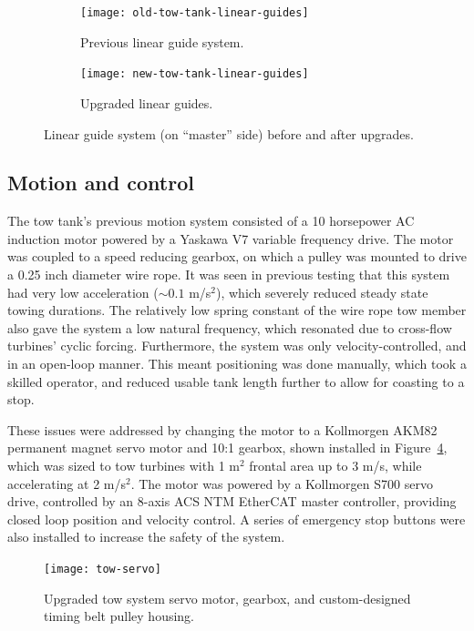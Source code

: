 \begin{figure}[ht]
    \centering
    
    \begin{subfigure}{0.47\textwidth}
        \texttt{[image: old-tow-tank-linear-guides]}
        \caption{Previous linear guide system.}
        \label{fig:old-linear-guides}
    \end{subfigure}
    \begin{subfigure}{0.47\textwidth}
        \texttt{[image: new-tow-tank-linear-guides]}
        \caption{Upgraded linear guides.}
        \label{fig:new-linear-guides}
    \end{subfigure}
    
    \caption{Linear guide system (on ``master'' side) before and after
        upgrades.}
\end{figure}


\subsection{Motion and control}

The tow tank's previous motion system consisted of a 10 horsepower AC induction
motor powered by a Yaskawa V7 variable frequency drive. The motor was coupled to
a speed reducing gearbox, on which a pulley was mounted to drive a 0.25 inch
diameter wire rope. It was seen in previous testing that this system had very
low acceleration ($\sim 0.1$ m/s$^2$), which severely reduced steady state
towing durations. The relatively low spring constant of the wire rope tow member
also gave the system a low natural frequency, which resonated due to cross-flow
turbines' cyclic forcing. Furthermore, the system was only velocity-controlled,
and in an open-loop manner. This meant positioning was done manually, which took
a skilled operator, and reduced usable tank length further to allow for coasting
to a stop.

These issues were addressed by changing the motor to a Kollmorgen AKM82
permanent magnet servo motor and 10:1 gearbox, shown installed in
Figure~\ref{fig:tow-servo}, which was sized to tow turbines with 1 m$^2$ frontal
area up to 3 m/s, while accelerating at 2 m/s$^2$. The motor was powered by a
Kollmorgen S700 servo drive, controlled by an 8-axis ACS NTM EtherCAT master
controller, providing closed loop position and velocity control. A series of
emergency stop buttons were also installed to increase the safety of the system.

\begin{figure}[ht]
    \centering
    
    \texttt{[image: tow-servo]}
    
    \caption{Upgraded tow system servo motor, gearbox, and custom-designed
        timing belt pulley housing.} 
    
    \label{fig:tow-servo}
\end{figure}

